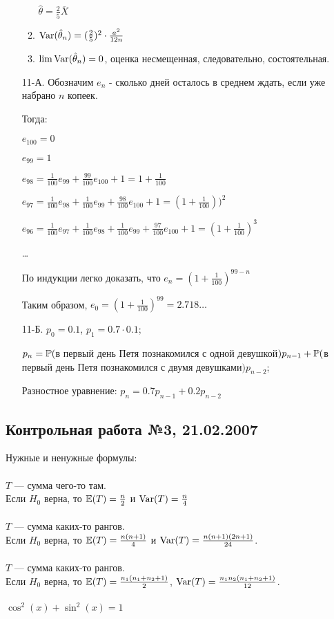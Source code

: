 \begin{enumerate}
\begin{enumerate}
$\hat{\theta}=\frac{2}{5}\overline{X}$
\item $\Var(\hat{\theta}_{n})=(\frac{2}{5})^{2}\cdot\frac{a^{2}}{12n}$
\item $\lim \Var(\hat{\theta}_{n})=0$, оценка несмещенная,
следовательно, состоятельная.
\end{enumerate}
\item[11-А.] Обозначим $e_{n}$ - сколько дней осталось в среднем ждать, если
уже набрано $n$ копеек.

Тогда:

$e_{100}=0$

$e_{99}=1$

$e_{98}=\frac{1}{100}e_{99}+\frac{99}{100}e_{100}+1=1+\frac{1}{100}$

$e_{97}=\frac{1}{100}e_{98}+\frac{1}{100}e_{99}+\frac{98}{100}e_{100}+1=(1+\frac{1}{100}))^{2}$

$e_{96}=\frac{1}{100}e_{97}+\frac{1}{100}e_{98}+\frac{1}{100}e_{99}+\frac{97}{100}e_{100}+1=(1+\frac{1}{100})^{3}$

\ldots

По индукции легко доказать, что $e_{n}=(1+\frac{1}{100})^{99-n}$

Таким образом, $e_{0}=(1+\frac{1}{100})^{99}=2.718 \ldots$

\item[11-Б.]  $p_{0}=0.1$, $p_{1}=0.7\cdot 0.1$;

$p_{n}=\P($в первый день Петя познакомился с одной
девушкой$)p_{n-1}+\P($в первый день Петя познакомился с двумя
девушками$)p_{n-2}$;

Разностное уравнение: $p_{n}=0.7p_{n-1}+0.2p_{n-2}$
\end{enumerate}

\subsection{Контрольная работа №3, 21.02.2007}

Нужные и ненужные формулы: \\ \\
$T$ — сумма чего-то там. \\
Если $H_{0}$ верна, то $\E(T)=\frac{n}{2}$ и $\Var(T)=\frac{n}{4}$ \\ \\
$T$ — сумма каких-то рангов. \\
Если $H_{0}$ верна, то $\E(T)=\frac{n(n+1)}{4}$ и
$\Var(T)=\frac{n(n+1)(2n+1)}{24}$. \\ \\
$T$ — сумма каких-то рангов. \\
Если $H_{0}$ верна, то $\E(T)=\frac{n_{1}(n_{1}+n_{2}+1)}{2}$,
$\Var(T)=\frac{n_{1}n_{2}(n_{1}+n_{2}+1)}{12}$. \\ \\
$\cos^{2}(x)+\sin^{2}(x)=1$ \\ \\

